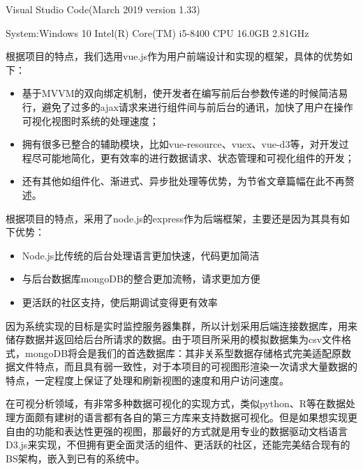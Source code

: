 
Visual Studio Code(March 2019 version 1.33)

System:Windows 10  Intel(R) Core(TM) i5-8400 CPU 16.0GB 2.81GHz


根据项目的特点，我们选用vue.js作为用户前端设计和实现的框架，具体的优势如下：
\begin{itemize}
	\item 基于MVVM的双向绑定机制，使开发者在编写前后台参数传递的时候简洁易行，避免了过多的ajax请求来进行组件间与前后台的通讯，加快了用户在操作可视化视图时系统的处理速度；
	\item 拥有很多已整合的辅助模块，比如vue-resource、vuex、vue-d3等，对开发过程尽可能地简化，更有效率的进行数据请求、状态管理和可视化组件的开发；
	\item 还有其他如组件化、渐进式、异步批处理等优势，为节省文章篇幅在此不再赘述。
\end{itemize}


根据项目的特点，采用了node.js的express作为后端框架，主要还是因为其具有如下优势：

\begin{itemize}
	\item Node.js比传统的后台处理语言更加快速，代码更加简洁
	\item 与后台数据库mongoDB的整合更加流畅，请求更加方便
	\item 更活跃的社区支持，使后期调试变得更有效率
\end{itemize}


因为系统实现的目标是实时监控服务器集群，所以计划采用后端连接数据库，用来储存数据并返回给后台所请求的数据。由于项目所采用的模拟数据集为csv文件格式，mongoDB将会是我们的首选数据库：其非关系型数据存储格式完美适配原数据文件特点，而且具有弱一致性，对于本项目的可视图形渲染一次请求大量数据的特点，一定程度上保证了处理和刷新视图的速度和用户访问速度。


在可视分析领域，有非常多种数据可视化的实现方式，类似python、R等在数据处理方面颇有建树的语言都有各自的第三方库来支持数据可视化。但是如果想实现更自由的功能和表达性更强的视图，那最好的方式就是用专业的数据驱动文档语言D3.js来实现，不但拥有更全面灵活的组件、更活跃的社区，还能完美结合现有的BS架构，嵌入到已有的系统中。

